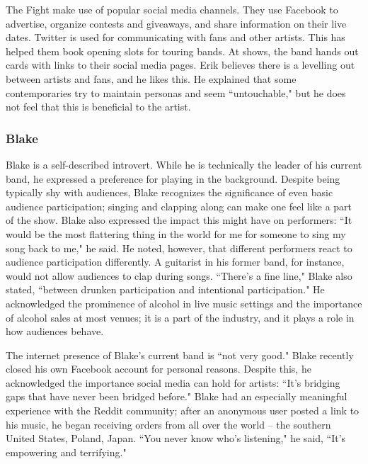 The Fight make use of popular social media channels. They use Facebook to advertise, organize contests and giveaways, and share information on their live dates. Twitter is used for communicating with fans and other artists. This has helped them book opening slots for touring bands. At shows, the band hands out cards with links to their social media pages. Erik believes there is a levelling out between artists and fans, and he likes this. He explained that some contemporaries try to maintain personas and seem ``untouchable," but he does not feel that this is beneficial to the artist.

\subsubsection{Blake}
Blake is a self-described introvert. While he is technically the leader of his current band, he expressed a preference for playing in the background. Despite being typically shy with audiences, Blake recognizes the significance of even basic audience participation; singing and clapping along can make one feel like a part of the show. Blake also expressed the impact this might have on performers: ``It would be the most flattering thing in the world for me for someone to sing my song back to me," he said. He noted, however, that different performers react to audience participation differently. A guitarist in his former band, for instance, would not allow audiences to clap during songs. ``There's a fine line," Blake also stated, ``between drunken participation and intentional participation." He acknowledged the prominence of alcohol in live music settings and the importance of alcohol sales at most venues; it is a part of the industry, and it plays a role in how audiences behave.

The internet presence of Blake's current band is ``not very good." Blake recently closed his own Facebook account for personal reasons. Despite this, he acknowledged the importance social media can hold for artists: ``It's bridging gaps that have never been bridged before." Blake had an especially meaningful experience with the Reddit community; after an anonymous user posted a link to his music, he began receiving orders from all over the world -- the southern United States, Poland, Japan. ``You never know who's listening," he said, ``It's empowering and terrifying."

